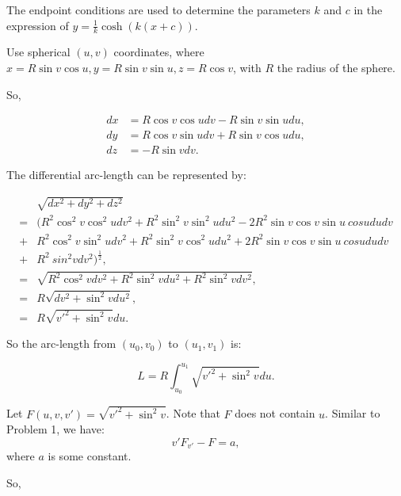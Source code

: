 \documentclass[
  course = {{16-811 Math Fundamentals for Robotics}},
  quartile = {{1}},
  assignment = 5,
  name = {{Kangle Deng}},
  email = {{kangled@andrew.cmu.edu}},
  firstexercise = 1
]{aga-homework}
\begin{document}
The endpoint conditions are used to determine the parameters $k$ and $c$ in the expression of $y = \frac{1}{k}\cosh(k(x+c))$.

\exercise

Use spherical $(u,v)$ coordinates, where $x=R\sin v \cos u, y = R\sin v\sin u, z = R \cos v$, with $R$ the radius of the sphere.

So,

\begin{equation*}
    \begin{aligned}
     dx & = R\cos v \cos u dv - R \sin v \sin u du, \\
     dy & = R\cos v \sin u dv + R \sin v \cos u du, \\
     dz & = -R\sin v dv.
    \end{aligned}
\end{equation*}

The differential arc-length can be represented by:

\begin{equation*}
    \begin{aligned}
     & \sqrt{dx^2+dy^2+dz^2} \\
     = & (R^2\cos^2v\cos^2udv^2 + R^2\sin^2v\sin^2udu^2 - 2R^2\sin v \cos v \sin u \ cos u du dv \\
     + & R^2\cos^2v\sin^2udv^2 + R^2\sin^2v\cos^2udu^2 + 2R^2\sin v \cos v \sin u \ cos u du dv \\
     + & R^2 \ sin^2 v dv^2)^\frac{1}{2}, \\
     = & \sqrt{R^2\cos^2vdv^2 + R^2\sin^2 v du^2 + R^2\sin^2vdv^2},\\
     = & R \sqrt{dv^2 + \sin^2vdu^2}, \\
     = & R \sqrt{v'^2 + \sin^2v} du.
    \end{aligned}
\end{equation*}

So the arc-length from $(u_0, v_0)$ to $(u_1, v_1)$ is:

\begin{equation*}
    L = R \int_{u_0}^{u_1} \sqrt{v'^2 + \sin^2v} du.
\end{equation*}

Let $F(u, v, v') = \sqrt{v'^2 + \sin^2v}$. Note that $F$ does not contain $u$. Similar to Problem 1, we have:
\begin{equation*}
    v'F_{v'} - F = a,
\end{equation*}
where $a$ is some constant.

So,
\end{document}
